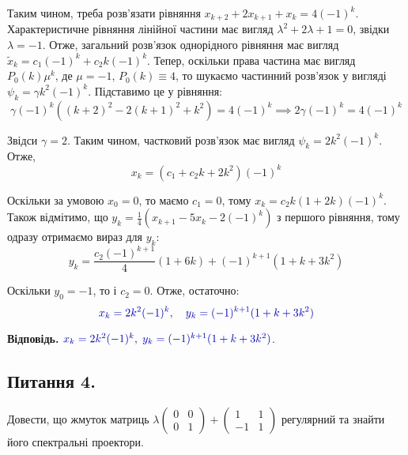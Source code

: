\documentclass{hw_template}
\begin{document}
Таким чином, треба розв'язати рівняння $x_{k+2} + 2x_{k+1} + x_k = 4(-1)^k$.
Характеристичне рівняння лінійної частини має вигляд $\lambda^2 + 2\lambda + 1 =
0$, звідки $\lambda = -1$. Отже, загальний розв'язок однорідного рівняння має
вигляд $\widetilde{x}_k = c_1(-1)^k + c_2 k(-1)^k$. Тепер, оскільки права 
частина має вигляд $P_0(k)\mu^k$, де $\mu = -1$, $P_0(k) \equiv 4$, то шукаємо 
частинний розв'язок у вигляді $\psi_k = \gamma k^2(-1)^k$. Підставимо це у рівняння:
\begin{equation*}
    \gamma (-1)^k\left((k+2)^2 - 2(k+1)^2 + k^2\right) = 4(-1)^k \implies 2\gamma(-1)^k = 4(-1)^k
\end{equation*}

Звідси $\gamma = 2$. Таким чином, частковий розв'язок має вигляд $\psi_k = 2k^2(-1)^k$. Отже,
\begin{equation*}
    x_k = \left(c_1 + c_2 k + 2k^2\right)(-1)^k
\end{equation*}

Оскільки за умовою $x_0=0$, то маємо $c_1=0$, тому $x_k = c_2k(1+2k)(-1)^k$. Також 
відмітимо, що $y_k = \frac{1}{4}(x_{k+1}-5x_k-2(-1)^k)$ з першого рівняння, тому одразу отримаємо вираз для $y_k$:
\begin{equation*}
    y_k = \frac{c_2(-1)^{k+1}}{4}\left(1+6k\right) + (-1)^{k+1}(1+k+3k^2)
\end{equation*}

Оскільки $y_0=-1$, то і $c_2=0$. Отже, остаточно:
\begin{equation*}
    \textcolor{blue!70!black}{x_k = 2k^2(-1)^k, \quad y_k = (-1)^{k+1}(1+k+3k^2)}
\end{equation*}

\textbf{Відповідь.} $\textcolor{blue!70!black}{x_k = 2k^2(-1)^k, \; y_k = (-1)^{k+1}(1+k+3k^2)}$.

\newpage

\subsection{Питання 4.}
\begin{problems}
    Довести, що жмуток матриць $\lambda\begin{pmatrix}
        0 & 0 \\ 0 & 1
    \end{pmatrix} + \begin{pmatrix}
        1 & 1 \\ -1 & 1
    \end{pmatrix}$ регулярний та знайти його спектральні проектори.
\end{problems}
\end{document}
